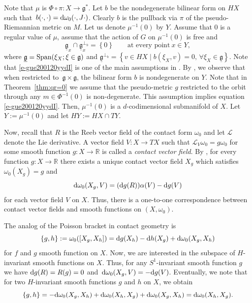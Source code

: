 \documentclass[10pt,a4paper]{amsart}
\numberwithin{equation}{section}
\newcommand{\set}[1]{\left\{#1\right\}}
\begin{document}
 	Note that $\mu$ is $\Phi\circ \pi \colon X \rightarrow \mathfrak{g}^*$. Let $b$ be the nondegenerate bilinear form on $HX$ such that~${
	 	b(\cdot , \cdot) = {\rm d}\omega_0(\cdot , J\cdot)}$.
	 Clearly $b$ is the pullback via $\pi$ of the pseudo-Riemannian metric on $M$. Let us denote $\mu^{-1}(0)$ by $Y$. Assume that $0$ is a regular value of $\mu$, assume that the action of $G$ on $\mu^{-1}(0)$ is free and
	 \begin{equation}\label{e-gue200120yydI}
	\underline{\mathfrak{g}}_x\cap \underline{\mathfrak{g}}^{\perp_b}_x=\set{0}\qquad \text{at every point} \ x\in Y,
	 \end{equation}
	 where $\underline{\mathfrak{g}}={\rm Span}(\xi_X; \xi\in\mathfrak{g})$
	 and
$\underline{\mathfrak{g}}^{\perp_b}=\set{v\in HX \mid b(\xi_X,v)=0,\,\forall \xi_X\in\underline{\mathfrak{g}}}$.
	 Note that \eqref{e-gue200120yydI} is one of the main assumptions in \cite{hsiaohuang}. By \cite[Section 2.5]{hsiaohuang}, we observe that when restricted to~${\mathfrak{g}\times \mathfrak{g}}$, the bilinear form $b$ is nondegenerate on $Y$. Note that in Theorem~\ref{thm:qr=0} we assume that the pseudo-metric $g$ restricted to the orbit through any $m\in \Phi^{-1}(0)$ is non-degenerate. This assumption implies equation \eqref{e-gue200120yydI}. Then, $\mu^{-1}(0)$ is a $d$-codimensional submanifold of $X$. Let $Y:=\mu^{-1}(0)$ and let $HY:=HX\cap TY$.
	
	
	 Now, recall that $R$ is the Reeb vector field of the contact form $\omega_0$ and let $\mathcal{L}$ denote the Lie derivative. A vector field $V \colon X \rightarrow TX$ such that $\mathcal{L}_V\omega_0=g \omega_0$ for some smooth function $g \colon X\rightarrow \mathbb{R}$ is called a \textit{contact vector field}. By \cite[Lemma 3.5.14]{mds}, for every function $g \colon X\rightarrow \mathbb{R}$ there exists a unique contact vector field $X_g$ which satisfies
	$\omega_0(X_g)=g $
	 and
	 \[ {\rm d}\omega_0(X_g, V)=({\rm d}g(R)) \alpha(V)-{\rm d}g(V)\]
	 for each vector field $V$ on $X$.
	 Thus, there is a one-to-one correspondence between contact vector fields and smooth functions on $(X, \omega_0)$.
	
	 The analog of the Poisson bracket in contact geometry is
	 \[\{g, h\}:=\omega_0([X_g, X_h])={\rm d}g(X_h)-{\rm d}h(X_g)+{\rm d}\omega_0(X_g, X_h) \]
	 for $f$ and $g$ smooth function on $X$. Now, we are interested in the subspace of $H$-invariant smooth functions on $X$. Thus, for any $S^1$-invariant smooth function $g$ we have ${\rm d}g(R)=R(g)=0$ and~${{\rm d}\omega_0(X_g, V)=-{\rm d}g(V)}$.
	 Eventually, we note that for two $H$-invariant smooth functions $g$ and $h$ on $X$, we obtain
	 \[\{g, h\}=-{\rm d}\omega_0(X_g, X_h)+{\rm d}\omega_0(X_h, X_g)+{\rm d}\omega_0(X_g, X_h)={\rm d}\omega_0(X_h, X_g) .\]
	
\end{document}
